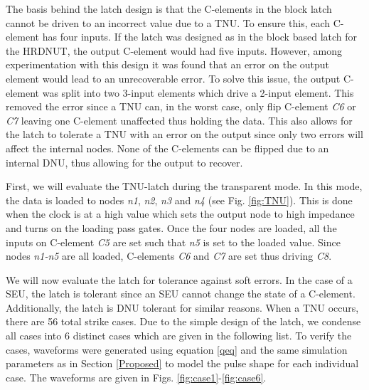 The basis behind the latch design is that the C-elements in the block latch cannot be driven to an incorrect value due to a TNU. To ensure this, each C-element has four inputs. If the latch was designed as in the block based latch for the HRDNUT, the output C-element would had five inputs. However, among experimentation with this design it was found that an error on the output element would lead to an unrecoverable error. To solve this issue, the output C-element was split into two 3-input elements which drive a 2-input element. This removed the error since a TNU can, in the worst case, only flip C-element \textit{C6} or \textit{C7} leaving one C-element unaffected thus holding the data. This also allows for the latch to tolerate a TNU with an error on the output since only two errors will affect the internal nodes. None of the C-elements can be flipped due to an internal DNU, thus allowing for the output to recover.

First, we will evaluate the TNU-latch during the transparent mode. In this mode, the data is loaded to nodes \textit{n1}, \textit{n2}, \textit{n3} and \textit{n4} (see Fig. \ref{fig:TNU}). This is done when the clock is at a high value which sets the output node to high impedance and turns on the loading pass gates. Once the four nodes are loaded, all the inputs on C-element \textit{C5} are set such that \textit{n5} is set to the loaded value. Since nodes \textit{n1-n5} are all loaded, C-elements \textit{C6} and \textit{C7} are set thus driving \textit{C8}.

We will now evaluate the latch for tolerance against soft errors. In the case of a SEU, the latch is tolerant since an SEU cannot change the state of a C-element. Additionally, the latch is DNU tolerant for similar reasons. When a TNU occurs, there are 56 total strike cases. Due to the simple design of the latch, we condense all cases into 6 distinct cases which are given in the following list. To verify the cases, waveforms were generated using equation \ref{qeq} and the same simulation parameters as in Section \ref{Proposed} to model the pulse shape for each individual case. The waveforms are given in Figs. \ref{fig:case1}-\ref{fig:case6}.


